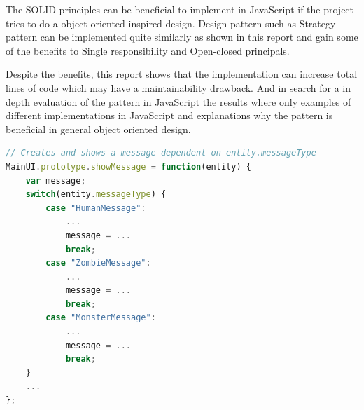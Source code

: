 \documentclass[conference, a4paper]{IEEEtran}
\begin{document}
The SOLID principles can be beneficial to implement in JavaScript if the project tries to do a object oriented inspired design. Design pattern such as Strategy pattern can be implemented quite similarly as shown in this report and gain some of the benefits to Single responsibility and Open-closed principals.

Despite the benefits, this report shows that the implementation can increase total lines of code which may have a maintainability drawback. And in search for a in depth evaluation of the pattern in JavaScript the results where only examples of different implementations in JavaScript and explanations why the pattern is beneficial in general object oriented design.

\clearpage
\appendix

\begin{lstlisting}[language=JavaScript, label=lst:switch-case, caption=\texttt{MainUI.js} The original switch case.]
// Creates and shows a message dependent on entity.messageType
MainUI.prototype.showMessage = function(entity) {
	var message;
	switch(entity.messageType) {
		case "HumanMessage":
			...
			message = ...
			break;
		case "ZombieMessage":
			...
			message = ...
			break;
		case "MonsterMessage":
			...
			message = ...
			break;
	}
	...
};
\end{lstlisting}
\end{document}
